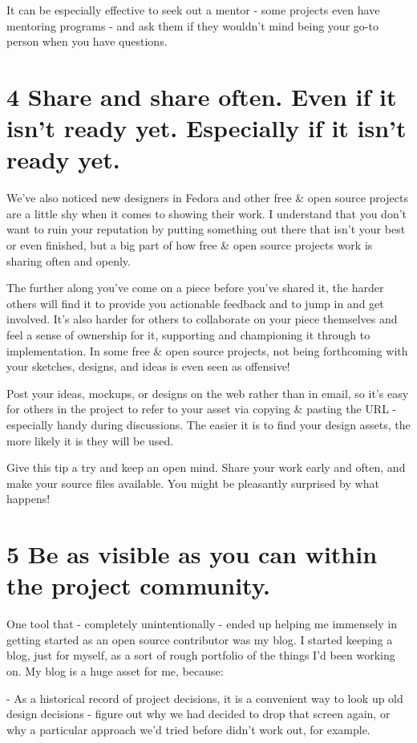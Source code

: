 It can be especially effective to seek out a mentor - some projects even have
mentoring programs - and ask them if they wouldn't mind being your go-to person
when you have questions. 

\section*{4 Share and share often. Even if it isn't ready yet. Especially if it
isn't ready yet.}

We've also noticed new designers in Fedora and other free \& open source projects
are a little shy when it comes to showing their work. I understand that you
don't want to ruin your reputation by putting something out there that isn't
your best or even finished, but a big part of how free \& open source projects
work is sharing often and openly. 

The further along you've come on a piece before you've shared it, the harder
others will find it to provide you actionable feedback and to jump in and get
involved. It's also harder for others to collaborate on your piece themselves
and feel a sense of ownership for it, supporting and championing it through to
implementation. In some free \& open source projects, not being forthcoming with
your sketches, designs, and ideas is even seen as offensive! 

Post your ideas, mockups, or designs on the web rather than in email, so it's
easy for others in the project to refer to your asset via copying \& pasting the
URL - especially handy during discussions. The easier it is to find your design
assets, the more likely it is they will be used. 

Give this tip a try and keep an open mind. Share your work early and often, and
make your source files available. You might be pleasantly surprised by what
happens!

\section*{5 Be as visible as you can within the project community.}

One tool that - completely unintentionally - ended up helping me immensely in
getting started as an open source contributor was my blog. I started keeping a
blog, just for myself, as a sort of rough portfolio of the things I'd been
working on. My blog is a huge asset for me, because:

- As a historical record of project decisions, it is a convenient way to look up
old design decisions - figure out why we had decided to drop that screen again,
or why a particular approach we'd tried before didn't work out, for example.

